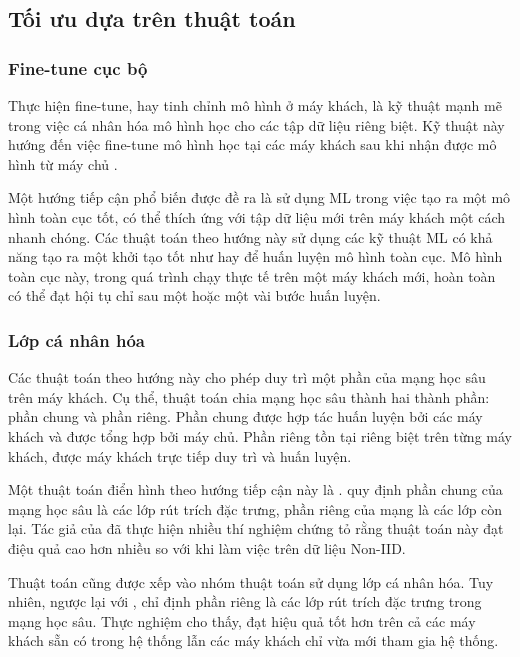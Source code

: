 \subsection{Tối ưu dựa trên thuật toán}

\subsubsection{Fine-tune cục bộ}

Thực hiện fine-tune, hay tinh chỉnh mô hình ở máy khách, là kỹ thuật mạnh mẽ trong việc cá nhân hóa mô hình học cho các tập dữ liệu riêng biệt. Kỹ thuật này hướng đến việc fine-tune mô hình học tại các máy khách sau khi nhận được mô hình từ máy chủ \cite{wang2019federated}.

Một hướng tiếp cận phổ biến được đề ra là sử dụng ML trong việc tạo ra một mô hình toàn cục tốt, có thể thích ứng với tập dữ liệu mới trên máy khách một cách nhanh chóng. Các thuật toán theo hướng này \parencite{chen2018federated, fallah2020personalized} sử dụng các kỹ thuật ML có khả năng tạo ra một khởi tạo tốt như  \cite{finn2017model} hay  \cite{li2017meta} để huấn luyện mô hình toàn cục. Mô hình toàn cục này, trong quá trình chạy thực tế trên một máy khách mới, hoàn toàn có thể đạt hội tụ chỉ sau một hoặc một vài bước huấn luyện.

\subsubsection{Lớp cá nhân hóa}

Các thuật toán theo hướng này cho phép duy trì một phần của mạng học sâu trên máy khách. Cụ thể, thuật toán chia mạng học sâu thành hai thành phần: phần chung và phần riêng. Phần chung được hợp tác huấn luyện bởi các máy khách và được tổng hợp bởi máy chủ. Phần riêng tồn tại riêng biệt trên từng máy khách, được máy khách trực tiếp duy trì và huấn luyện.

Một thuật toán điển hình theo hướng tiếp cận này là  \cite{arivazhagan2019federated}.  quy định phần chung của mạng học sâu là các lớp rút trích đặc trưng, phần riêng của mạng là các lớp còn lại. Tác giả của  đã thực hiện nhiều thí nghiệm chứng tỏ rằng thuật toán này đạt điệu quả cao hơn nhiều so với  khi làm việc trên dữ liệu Non-IID.

Thuật toán  \cite{liang2020think} cũng được xếp vào nhóm thuật toán sử dụng lớp cá nhân hóa. Tuy nhiên, ngược lại với ,  chỉ định phần riêng là các lớp rút trích đặc trưng trong mạng học sâu. Thực nghiệm cho thấy,  đạt hiệu quả tốt hơn  trên cả các máy khách sẵn có trong hệ thống lẫn các máy khách chỉ vừa mới tham gia hệ thống.

